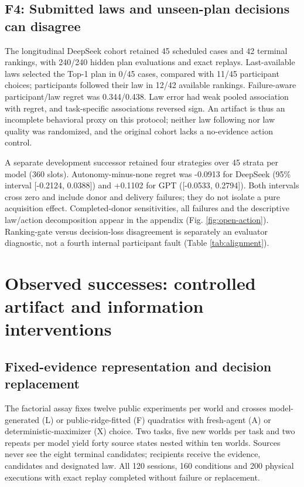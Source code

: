 \documentclass{article}
\begin{document}
\subsection{F4: Submitted laws and unseen-plan decisions can
disagree}\label{f4-submitted-laws-and-unseen-plan-decisions-can-disagree}

The longitudinal DeepSeek cohort retained 45 scheduled cases and 42
terminal rankings, with 240/240 hidden plan evaluations and exact
replays. Last-available laws selected the Top-1 plan in 0/45 cases,
compared with 11/45 participant choices; participants followed their law
in 12/42 available rankings. Failure-aware participant/law regret was
0.344/0.438. Law error had weak pooled association with regret, and
task-specific associations reversed sign. An artifact is thus an
incomplete behavioral proxy on this protocol; neither law following nor
law quality was randomized, and the original cohort lacks a no-evidence
action control.

A separate development successor retained four strategies over 45 strata
per model (360 slots). Autonomy-minus-none regret was -0.0913 for
DeepSeek (95\% interval {[}-0.2124, 0.0388{]}) and +0.1102 for GPT
({[}-0.0533, 0.2794{]}). Both intervals cross zero and include donor and
delivery failures; they do not isolate a pure acquisition effect.
Completed-donor sensitivities, all failures and the descriptive
law/action decomposition appear in the appendix (Fig.
\ref{fig:open-action}). Ranking-gate versus decision-loss disagreement
is separately an evaluator diagnostic, not a fourth internal participant
fault (Table \ref{tab:alignment}).

\section{Observed successes: controlled artifact and information
interventions}\label{observed-successes-controlled-artifact-and-information-interventions}

\subsection{Fixed-evidence representation and decision
replacement}\label{fixed-evidence-representation-and-decision-replacement}

The factorial assay fixes twelve public experiments per world and
crosses model-generated (L) or public-ridge-fitted (F) quadratics with
fresh-agent (A) or deterministic-maximizer (X) choice. Two tasks, five
new worlds per task and two repeats per model yield forty source states
nested within ten worlds. Sources never see the eight terminal
candidates; recipients receive the evidence, candidates and designated
law. All 120 sessions, 160 conditions and 200 physical executions with
exact replay completed without failure or replacement.
\end{document}
